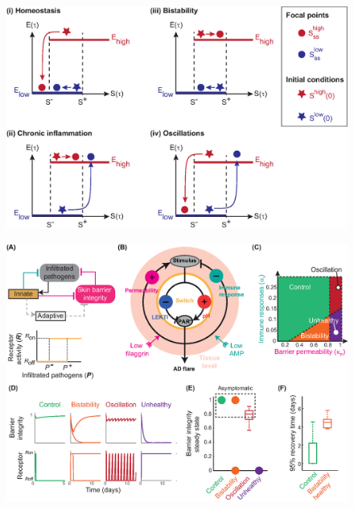 \documentclass[10pt,letterpaper]{article}
\begin{document}
\begin{figure}[h!]
  \centering
 \includegraphics[scale=.75]{Hybrid_system_behaviours.eps} 
  \caption{     }
 \label{fig: Hybrid_system_behaviours}
\end{figure}


\begin{figure}[h!]
  \centering
 \includegraphics[scale=.75]{Interface_model.eps} 
  \caption{\cite{Dominguez-Huttinger2016a} 
     }
 \label{fig: Interface_model}
\end{figure}






\end{document}

